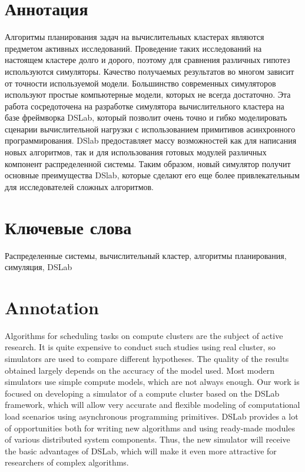 
\section*{Аннотация}

\vspace{-0.5cm}
Алгоритмы планирования задач на вычислительных кластерах являются предметом активных исследований. Проведение таких исследований на настоящем кластере долго и дорого, поэтому для сравнения различных гипотез используются симуляторы. Качество получаемых результатов во многом зависит от точности используемой модели. Большинство современных симуляторов используют простые компьютерные модели, которых не всегда достаточно. Эта работа сосредоточена на разработке симулятора вычислительного кластера на базе фреймворка DSLab, который позволит очень точно и гибко моделировать сценарии вычислительной нагрузки с использованием примитивов асинхронного программирования. DSlab предоставляет массу возможностей как для написания новых алгоритмов, так и для использования готовых модулей различных компонент распределенной системы. Таким образом, новый симулятор получит основные преимущества DSlab, которые сделают его еще более привлекательным для исследователей сложных алгоритмов.

\vspace{-0.5cm}
\section*{Ключевые слова}

Распределенные системы, вычислительный кластер, алгоритмы планирования, симуляция, DSLab
\vspace{-0.5cm}
\section*{Annotation}
\vspace{-0.5cm}
Algorithms for scheduling tasks on compute clusters are the subject of active research. It is quite expensive to conduct such studies using real cluster, so simulators are used to compare different hypotheses. The quality of the results obtained largely depends on the accuracy of the model used. Most modern simulators use simple compute models, which are not always enough. Our work is focused on developing a simulator of a compute cluster based on the DSLab framework, which will allow very accurate and flexible modeling of computational load scenarios using asynchronous programming primitives. DSLab provides a lot of opportunities both for writing new algorithms and using ready-made modules of various distributed system components. Thus, the new simulator will receive the basic advantages of DSLab, which will make it even more attractive for researchers of complex algorithms.


